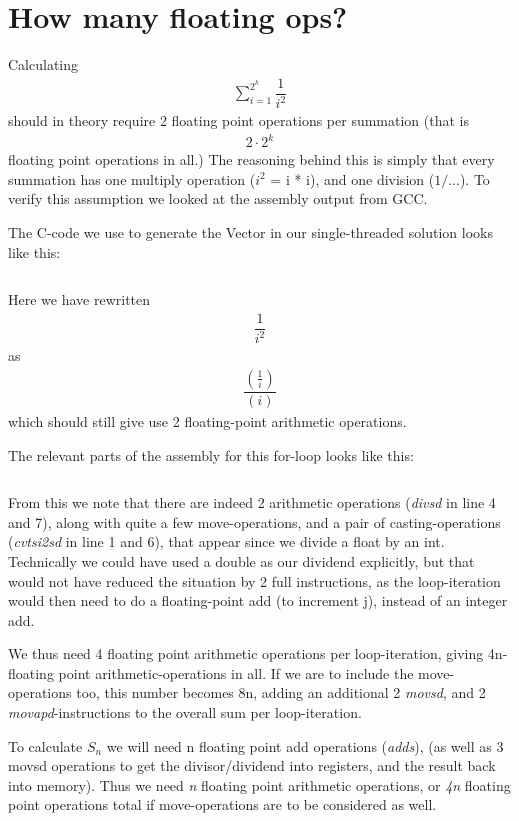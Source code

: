 \section{How many floating ops?}

Calculating \begin{align*}\sum_{i=1}^{2^k}\dfrac{1}{i^2}\end{align*} should in theory require 2 floating
point operations per summation (that is 
\begin{align*}2\cdot 2^k
\end{align*} 
floating point operations in all.)
The reasoning behind this is simply that every summation has one multiply operation ($i^2$ = i * i), and one division
($1/...$). To verify this assumption we looked at the assembly output from GCC.

The C-code we use to generate the Vector in our single-threaded solution
looks like this:
\inputminted[tabsize=4]{c}{CreateVector.c}

Here we have rewritten 
\begin{align*}
\dfrac{1}{i^2}
\end{align*} 
as 
\begin{align*}
\dfrac{\left(\frac{1}{i}\right)}{(i)}
\end{align*}
which
should still give use 2 floating-point arithmetic operations.

The relevant parts of the assembly for this for-loop looks like this:

\inputminted[linenos]{gas}{SingleThread.s}

From this we note that there are indeed 2 arithmetic operations (\emph{divsd} in line 4 and 7), along with quite a few move-operations,
and a pair of casting-operations (\emph{cvtsi2sd} in line 1 and 6), that appear since we divide a float by an int. Technically we could
have used a double as our dividend explicitly, but that would not have reduced the situation by 2 full instructions,
as the loop-iteration would then need to do a floating-point add (to increment j), instead of an integer add.

We thus need 4 floating point arithmetic operations per loop-iteration, giving 4n-floating point arithmetic-operations in all. If we are to include the move-operations too, this number becomes 8n, adding an additional 2 \emph{movsd},
and 2 \emph{movapd}-instructions to the overall sum per loop-iteration.

To calculate $S_n$ we will need n floating point add operations (\emph{adds}), (as well as 3 movsd operations to get the divisor/dividend
into registers, and the result back into memory). Thus we need \emph{n} floating point arithmetic operations, or \emph{4n} floating point
operations total if move-operations are to be considered as well.

